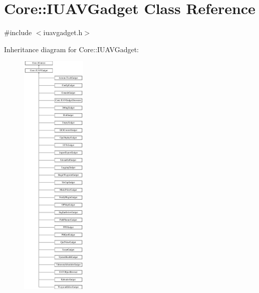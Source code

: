 \hypertarget{class_core_1_1_i_u_a_v_gadget}{\section{\-Core\-:\-:\-I\-U\-A\-V\-Gadget \-Class \-Reference}
\label{class_core_1_1_i_u_a_v_gadget}
}


{\ttfamily \#include $<$iuavgadget.\-h$>$}

\-Inheritance diagram for \-Core\-:\-:\-I\-U\-A\-V\-Gadget\-:\begin{figure}[H]
\begin{center}
\leavevmode
\includegraphics[height=12.000000cm]{class_core_1_1_i_u_a_v_gadget}
\end{center}
\end{figure}
